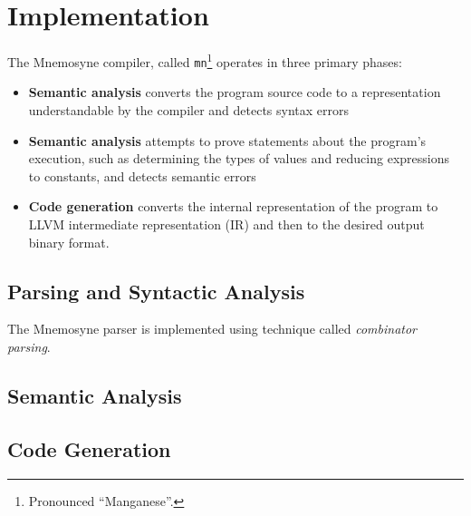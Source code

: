 %
%
%
\chapter{Implementation}\label{ch:implem}
The Mnemosyne compiler, called \texttt{mn}\footnote{Pronounced ``Manganese''.} operates in three primary phases:

\begin{itemize}
\item \textbf{Semantic analysis} converts the program source code to a representation understandable by the compiler and detects syntax errors
\item \textbf{Semantic analysis} attempts to prove statements about the program's execution, such as determining the types of values and reducing expressions to constants, and detects semantic errors
\item \textbf{Code generation} converts the internal representation of the program to LLVM intermediate representation (IR) and then to the desired output binary format.
\end{itemize}

\section{Parsing and Syntactic Analysis}\label{sec:parsing}
The Mnemosyne parser is implemented using technique called \textit{combinator parsing}.

\section{Semantic Analysis}\label{sec:analysis}
\section{Code Generation}\label{sec:codegen}
